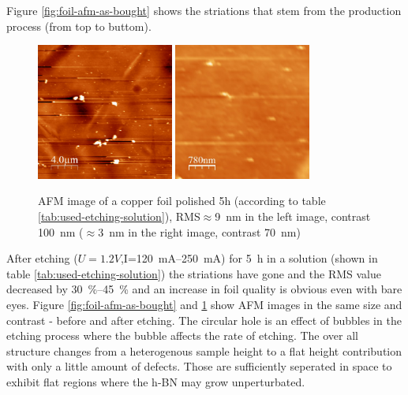 Figure \ref{fig:foil-afm-as-bought} shows the striations that stem from the production process (from top to buttom).
\begin{figure}[h]
 \centering
 \includegraphics[width=0.4\textwidth]{./images/polished0000.jpg}
 \includegraphics[width=0.4\textwidth]{./images/polished0001.jpg}
 \caption{AFM image of a copper foil polished 5h (according to table \ref{tab:used-etching-solution}), RMS$\approx$\SI{9}{\nm} in the left image, contrast \SI{100}{\nm} ($\approx$\SI{3}{\nm} in the right image, contrast \SI{70}{\nm})}
 \label{fig:foil-afm-polished}
\end{figure}
After etching ($U=1.2V$,I=\SIrange{120}{250}{\mA}) for \SI{5}{\hour} in a solution (shown in table \ref{tab:used-etching-solution}) the striations have gone and the RMS value decreased by \SIrange{30}{45}{\percent} and an increase in foil quality is obvious even with bare eyes. Figure \ref{fig:foil-afm-as-bought} and \ref{fig:foil-afm-polished} show AFM images in the same size and contrast - before and after etching.
The circular hole is an effect of bubbles in the etching process where the bubble affects the rate of etching. The over all structure changes from a heterogenous sample height to a flat height contribution with only a little amount of defects. Those are sufficiently seperated in space to exhibit flat regions where the h-BN may grow unperturbated.

